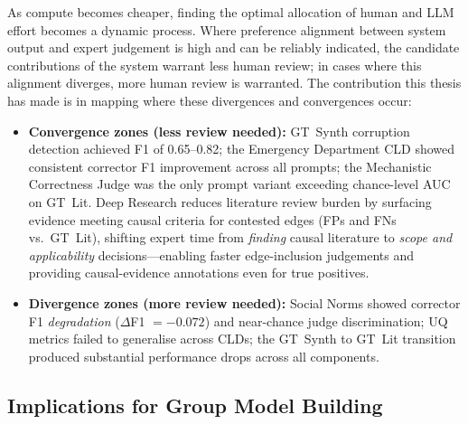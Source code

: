 As compute becomes cheaper, finding the optimal allocation of human and LLM effort becomes a dynamic process. Where preference alignment between system output and expert judgement is high and can be reliably indicated, the candidate contributions of the system warrant less human review; in cases where this alignment diverges, more human review is warranted. The contribution this thesis has made is in mapping where these divergences and convergences occur:

\begin{itemize}[noitemsep]
    \item \textbf{Convergence zones (less review needed):} GT~Synth corruption detection achieved F1 of 0.65--0.82; the Emergency Department CLD showed consistent corrector F1 improvement across all prompts; the Mechanistic Correctness Judge was the only prompt variant exceeding chance-level AUC on GT~Lit. Deep Research reduces literature review burden by surfacing evidence meeting causal criteria for contested edges (FPs and FNs vs.\ GT~Lit), shifting expert time from \emph{finding} causal literature to \emph{scope and applicability} decisions---enabling faster edge-inclusion judgements and providing causal-evidence annotations even for true positives.
    \item \textbf{Divergence zones (more review needed):} Social Norms showed corrector F1 \emph{degradation} ($\Delta$F1 $= -0.072$) and near-chance judge discrimination; UQ metrics failed to generalise across CLDs; the GT~Synth to GT~Lit transition produced substantial performance drops across all components.
\end{itemize}

\subsection{Implications for Group Model Building}

